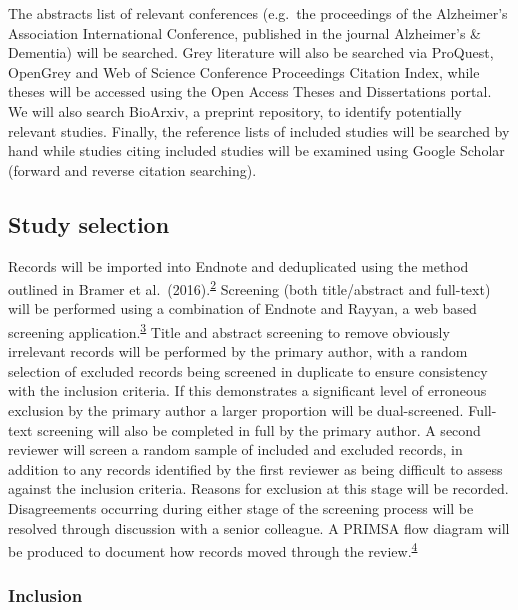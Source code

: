 \documentclass[a4paper, nobind]{templates/ociamthesis}
\begin{document}
The abstracts list of relevant conferences (e.g.~the proceedings of the Alzheimer's Association International Conference, published in the journal Alzheimer's \& Dementia) will be searched. Grey literature will also be searched via ProQuest, OpenGrey and Web of Science Conference Proceedings Citation Index, while theses will be accessed using the Open Access Theses and Dissertations portal. We will also search BioArxiv, a preprint repository, to identify potentially relevant studies. Finally, the reference lists of included studies will be searched by hand while studies citing included studies will be examined using Google Scholar (forward and reverse citation searching).

\hypertarget{study-selection}{%
\subsection{Study selection}\label{study-selection}}

Records will be imported into Endnote and deduplicated using the method outlined in Bramer et al.~(2016).\textsuperscript{\protect\hyperlink{ref-bramer2016}{2}} Screening (both title/abstract and full-text) will be performed using a combination of Endnote and Rayyan, a web based screening application.\textsuperscript{\protect\hyperlink{ref-ouzzani2016}{3}}
Title and abstract screening to remove obviously irrelevant records will be performed by the primary author, with a random selection of excluded records being screened in duplicate to ensure consistency with the inclusion criteria. If this demonstrates a significant level of erroneous exclusion by the primary author a larger proportion will be dual-screened.
Full-text screening will also be completed in full by the primary author. A second reviewer will screen a random sample of included and excluded records, in addition to any records identified by the first reviewer as being difficult to assess against the inclusion criteria. Reasons for exclusion at this stage will be recorded. Disagreements occurring during either stage of the screening process will be resolved through discussion with a senior colleague. A PRIMSA flow diagram will be produced to document how records moved through the review.\textsuperscript{\protect\hyperlink{ref-zotero-766}{4}}

\hypertarget{inclusion}{%
\subsubsection{Inclusion}\label{inclusion}}
\end{document}
